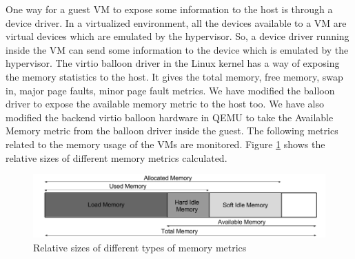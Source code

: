 One way for a guest VM to expose some information to the host is through a device driver. In a virtualized environment, all the devices available to a VM are virtual devices which are emulated by the hypervisor. So, a device driver running inside the VM can send some information to the device which is emulated by the hypervisor. The virtio balloon driver in the Linux kernel has a way of exposing the memory statistics to the host. It gives the total memory, free memory, swap in, major page faults, minor page fault metrics. We have modified the balloon driver to expose the available memory metric to the host too. We have also modified the backend virtio balloon hardware in QEMU to take the Available Memory metric from the balloon driver inside the guest. 
The following metrics related to the memory usage of the VMs are monitored. Figure \ref{fig:mem1} shows the relative sizes of different memory metrics calculated.
\begin{figure}[h]
  \centering
  \includegraphics[width=\textwidth]{mem1.png}
  \caption{Relative sizes of different types of memory metrics}\label{fig:mem1}
\end{figure}
